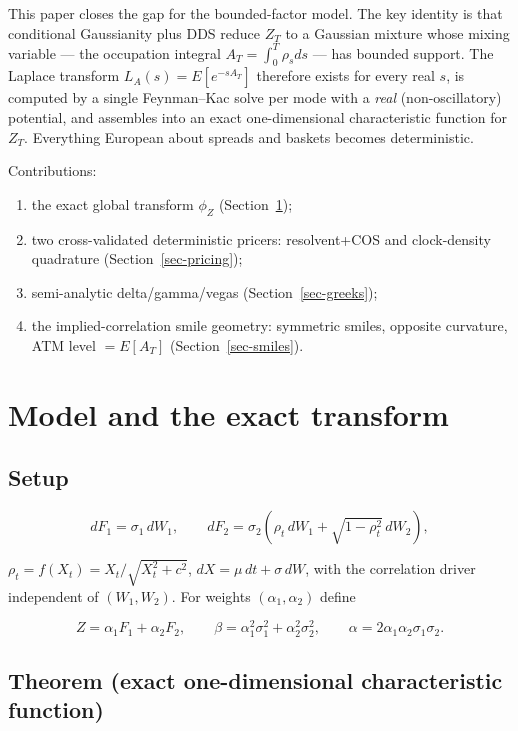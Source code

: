 \documentclass[
  english,
  10pt,
  letterpaper,
  DIV=11,
  numbers=noendperiod]{scrartcl}
\providecommand{\tightlist}{%
  \setlength{\itemsep}{0pt}\setlength{\parskip}{0pt}}
\begin{document}
This paper closes the gap for the bounded-factor model. The key identity
is that conditional Gaussianity plus DDS reduce \(Z_T\) to a Gaussian
mixture whose mixing variable --- the occupation integral
\(A_T=\int_0^T\rho_sds\) --- has bounded support. The Laplace transform
\(L_A(s)=E[e^{-sA_T}]\) therefore exists for every real \(s\), is
computed by a single Feynman--Kac solve per mode with a \emph{real}
(non-oscillatory) potential, and assembles into an exact one-dimensional
characteristic function for \(Z_T\). Everything European about spreads
and baskets becomes deterministic.

Contributions:

\begin{enumerate}
\def\labelenumi{\arabic{enumi}.}
\tightlist
\item
  the exact global transform \(\phi_Z\) (Section~\ref{sec-cf});
\item
  two cross-validated deterministic pricers: resolvent+COS and
  clock-density quadrature (Section~\ref{sec-pricing});
\item
  semi-analytic delta/gamma/vegas (Section~\ref{sec-greeks});
\item
  the implied-correlation smile geometry: symmetric smiles, opposite
  curvature, ATM level \(=E[A_T]\) (Section~\ref{sec-smiles}).
\end{enumerate}

\section{Model and the exact transform}\label{sec-cf}

\subsection{Setup}\label{setup}

\[
dF_1=\sigma_1\,dW_1,\qquad
dF_2=\sigma_2(\rho_t\,dW_1+\sqrt{1-\rho_t^2}\,dW_2),
\]

\(\rho_t=f(X_t)=X_t/\sqrt{X_t^2+c^2}\), \(dX=\mu\,dt+\sigma\,dW\), with
the correlation driver independent of \((W_1,W_2)\). For weights
\((\alpha_1,\alpha_2)\) define

\[
Z=\alpha_1F_1+\alpha_2F_2,\qquad
\beta=\alpha_1^2\sigma_1^2+\alpha_2^2\sigma_2^2,\qquad
\alpha=2\alpha_1\alpha_2\sigma_1\sigma_2 .
\]

\subsection{Theorem (exact one-dimensional characteristic
function)}\label{theorem-exact-one-dimensional-characteristic-function}
\end{document}
